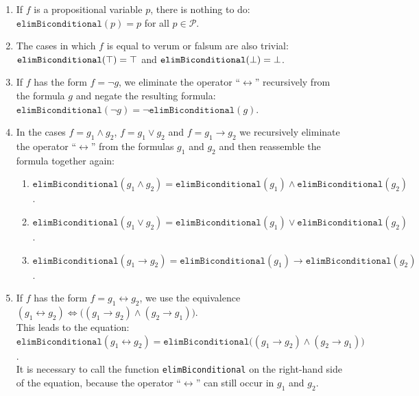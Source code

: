 \begin{enumerate}
\item If $f$ is a propositional variable $p$, there is nothing to do:
      \\[0.2cm]
      \hspace*{1.3cm}
      $\texttt{elimBiconditional}(p) = p$ \quad for all $p \in \mathcal{P}$.
\item The cases in which $f$ is equal to verum or  falsum are also trivial:
      \\[0.2cm]
      \hspace*{1.3cm}
      $\texttt{elimBiconditional}(\top) = \top$ \quad and \quad
      $\texttt{elimBiconditional}(\bot) = \bot$.
\item If $f$ has the form $f = \neg g$, we eliminate the operator
      ``$\leftrightarrow$'' recursively from the formula $g$ and negate the resulting formula: \\[0.2cm]
      \hspace*{1.3cm} 
      $\texttt{elimBiconditional}(\neg g) = \neg \texttt{elimBiconditional}(g)$.
\item In the cases $f = g_1 \wedge g_2$, $f = g_1 \vee g_2$ and $f = g_1 \rightarrow g_2$ we 
      recursively eliminate the operator ``$\leftrightarrow$'' from the formulas $g_1$ and $g_2$ and then reassemble the formula
      together again: 
      \begin{enumerate}
      \item $\texttt{elimBiconditional}(g_1 \wedge g_2) = \texttt{elimBiconditional}(g_1) \wedge \texttt{elimBiconditional}(g_2)$.
      \item $\texttt{elimBiconditional}(g_1 \vee g_2) = \texttt{elimBiconditional}(g_1) \vee \texttt{elimBiconditional}(g_2)$.
      \item $\texttt{elimBiconditional}(g_1 \rightarrow g_2) = \texttt{elimBiconditional}(g_1) \rightarrow \texttt{elimBiconditional}(g_2)$.
      \end{enumerate}
\item If $f$ has the form $f = g_1 \leftrightarrow g_2$, we use the
      equivalence \\[0.2cm]
      \hspace*{1.3cm} 
      $(g_1 \leftrightarrow g_2) \Leftrightarrow \bigl( (g_1 \rightarrow g_2) \wedge (g_2 \rightarrow g_1)\bigr) $.
      \\[0.2cm]
      This leads to the equation:
      \\[0.2cm]
      \hspace*{1.3cm} 
      $\texttt{elimBiconditional}(g_1 \leftrightarrow g_2) = \texttt{elimBiconditional}\bigl( (g_1 \rightarrow g_2) \wedge (g_2 \rightarrow g_1)\bigr)$. 
      \\[0.2cm]
      It is necessary to call the function \texttt{elimBiconditional} on the right-hand side of the equation,
      because the operator ``$\leftrightarrow$'' can still occur in $g_1$ and $g_2$.
\end{enumerate}


